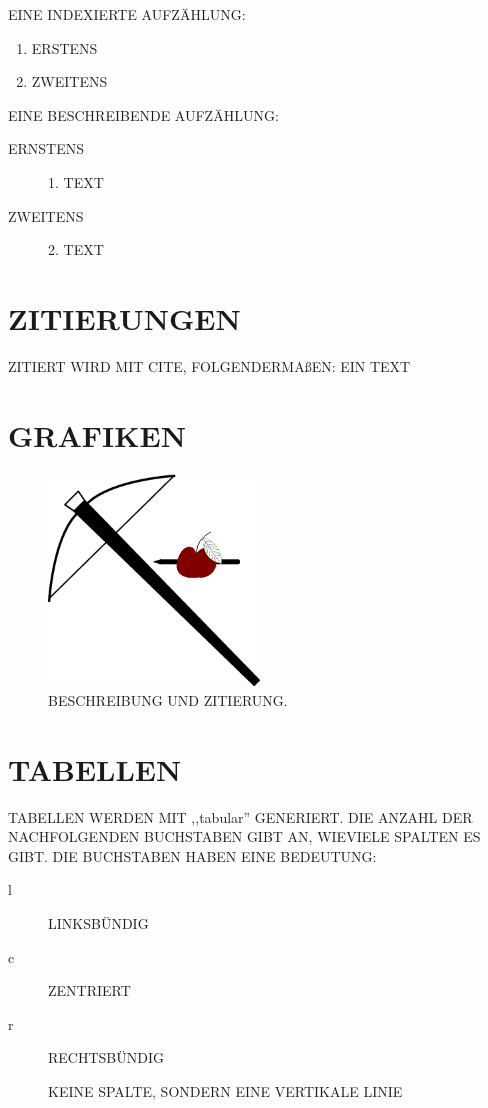 \documentclass[a4paper,12pt]{report}
\begin{document}
EINE INDEXIERTE AUFZÄHLUNG:
\begin{enumerate}
\item ERSTENS
\item ZWEITENS
\end{enumerate}

EINE BESCHREIBENDE AUFZÄHLUNG:
\begin{description}
\item[ERNSTENS] 1. TEXT
  \item[ZWEITENS] 2. TEXT
\end{description}

\section{ZITIERUNGEN}
\thispagestyle{fancy} %
ZITIERT WIRD MIT CITE, FOLGENDERMAßEN: EIN TEXT\cite{RUTH09}

\section{GRAFIKEN}
\thispagestyle{fancy} %
\begin{figure}[H]
  \centering
  \includegraphics[width=0.5\textwidth]{image.png}
  \caption{BESCHREIBUNG UND ZITIERUNG\cite{STEIG}.}
  \label{fig:image} %
\end{figure}
\FloatBarrier %

\section{TABELLEN}
\thispagestyle{fancy} %
TABELLEN WERDEN MIT ,,tabular'' GENERIERT. DIE ANZAHL DER NACHFOLGENDEN
BUCHSTABEN GIBT AN, WIEVIELE SPALTEN ES GIBT. DIE BUCHSTABEN HABEN
EINE BEDEUTUNG:
\begin{description}
\item[l] LINKSBÜNDIG
\item[c] ZENTRIERT
\item[r] RECHTSBÜNDIG
\item[\textbar] KEINE SPALTE, SONDERN EINE VERTIKALE LINIE
\end{description}
\end{document}
